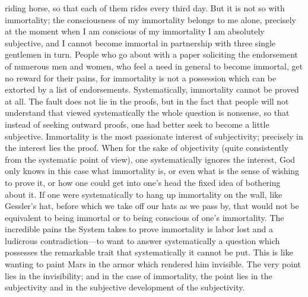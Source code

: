 \documentclass[12pt]{article}
\begin{document}
riding horse, so that each of them rides every third day. But it is not
so with immortality; the consciousness of my immortality belongs to me
alone, precisely at the moment when I am conscious of my immortality I
am absolutely subjective, and I cannot become immortal in partnership
with three single gentlemen in turn. People who go about with a paper
soliciting the endorsement of numerous men and women, who feel a need
in general to become immortal, get no reward for their pains, for
immortality is not a possession which can be extorted by a list of
endorsements. Systematically, immortality cannot be proved at all. The
fault does not lie in the proofs, but in the fact that people will not
understand that viewed systematically the whole question is nonsense,
so that instead of seeking outward proofs, one had better seek to
become a little subjective. Immortality is the most passionate interest
of subjectivity; precisely in the interest lies the proof. When for the
sake of objectivity (quite consistently from the systematic point of
view), one systematically ignores the interest, God only knows in this
case what immortality is, or even what is the sense of wishing to
prove it, or how one could get into one's head the fixed idea of
bothering about it. If one were systematically to hang up immortality
on the wall, like Gessler's hat, before which we take off our hats as
we pass by, that would not be equivalent to being immortal or to being
conscious of one's immortality. The incredible pains the System takes
to prove immortality is labor lost and a ludicrous contradiction---to
want to answer systematically a question which possesses the remarkable
trait that systematically it cannot be put. This is like wanting to
paint Mars in the armor which rendered him invisible. The very point
lies in the invisibility; and in the case of immortality, the point
lies in the subjectivity and in the subjective development of the
subjectivity.
\end{document}
